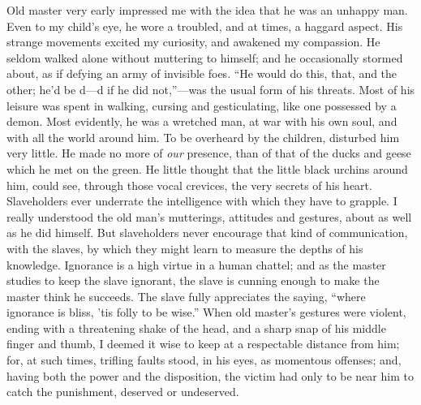 Old master very early impressed me with the idea that he was an unhappy
man. Even to my child's eye, he wore a troubled, and at times, a haggard
aspect. His strange movements excited my curiosity, and awakened my
compassion. He seldom walked alone {}without muttering to himself; and
he occasionally stormed about, as if defying an army of invisible foes.
``He would do this, that, and the other; he'd be d---d if he did
not,''---was the usual form of his threats. Most of his leisure was
spent in walking, cursing and gesticulating, like one possessed by a
demon. Most evidently, he was a wretched man, at war with his own soul,
and with all the world around him. To be overheard by the children,
disturbed him very little. He made no more of \emph{our} presence, than
of that of the ducks and geese which he met on the green. He little
thought that the little black urchins around him, could see, through
those vocal crevices, the very secrets of his heart. Slaveholders ever
underrate the intelligence with which they have to grapple. I really
understood the old man's mutterings, attitudes and gestures, about as
well as he did himself. But slaveholders never encourage that kind of
communication, with the slaves, by which they might learn to measure the
depths of his knowledge. Ignorance is a high virtue in a human chattel;
and as the master studies to keep the slave ignorant, the slave is
cunning enough to make the master think he succeeds. The slave fully
appreciates the saying, ``where ignorance is bliss, 'tis folly to be
wise.'' When old master's gestures were violent, ending with a
threatening shake of the head, and a sharp snap of his middle finger and
thumb, I deemed it wise to keep at a respectable distance from him; for,
at such times, trifling faults stood, in his eyes, as momentous
offenses; and, having both the power and the disposition, the victim had
only to {}be near him to catch the punishment, deserved or undeserved.

